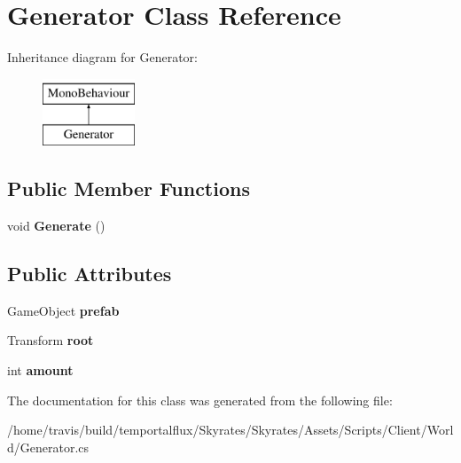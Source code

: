 \hypertarget{class_generator}{\section{Generator Class Reference}
\label{class_generator}
}
Inheritance diagram for Generator\-:\begin{figure}[H]
\begin{center}
\leavevmode
\includegraphics[height=2.000000cm]{class_generator}
\end{center}
\end{figure}
\subsection*{Public Member Functions}
\begin{DoxyCompactItemize}
\item 
\hypertarget{class_generator_a854a94f67c608fb8e99852f1cded7101}{void {\bfseries Generate} ()}\label{class_generator_a854a94f67c608fb8e99852f1cded7101}

\end{DoxyCompactItemize}
\subsection*{Public Attributes}
\begin{DoxyCompactItemize}
\item 
\hypertarget{class_generator_aa8c64e39ee9f749c79f92aad5e876ec2}{Game\-Object {\bfseries prefab}}\label{class_generator_aa8c64e39ee9f749c79f92aad5e876ec2}

\item 
\hypertarget{class_generator_a9cbc46ad1666f377cd522af1be8ff809}{Transform {\bfseries root}}\label{class_generator_a9cbc46ad1666f377cd522af1be8ff809}

\item 
\hypertarget{class_generator_a743c2ddf6d18a2b4388e9e2c4c2f014b}{int {\bfseries amount}}\label{class_generator_a743c2ddf6d18a2b4388e9e2c4c2f014b}

\end{DoxyCompactItemize}


The documentation for this class was generated from the following file\-:\begin{DoxyCompactItemize}
\item 
/home/travis/build/temportalflux/\-Skyrates/\-Skyrates/\-Assets/\-Scripts/\-Client/\-World/Generator.\-cs\end{DoxyCompactItemize}

